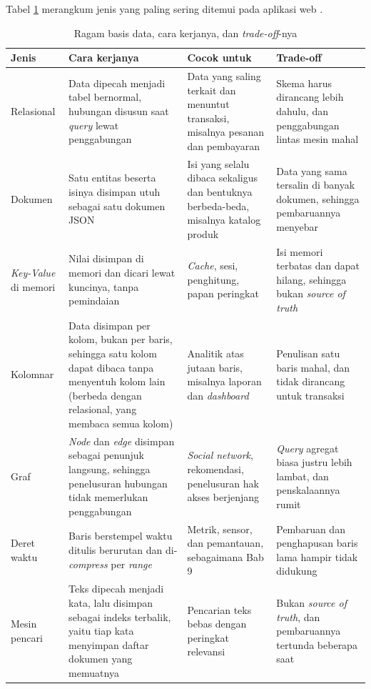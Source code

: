 Tabel \ref{tab:jenis-basis-data} merangkum jenis yang paling sering ditemui
pada aplikasi web \cite{kleppmann2017ddia}.

\begin{table}[!htb]
  \centering
  \caption{Ragam basis data, cara kerjanya, dan \textit{trade-off}-nya}
  \label{tab:jenis-basis-data}
  \begin{tabularx}{\textwidth}{lXXX}
    \hline
    \textbf{Jenis} & \textbf{Cara kerjanya} & \textbf{Cocok untuk} & \textbf{Trade-off} \\
    \hline
    Relasional & Data dipecah menjadi tabel bernormal, hubungan disusun saat \textit{query} lewat penggabungan & Data yang saling terkait dan menuntut transaksi, misalnya pesanan dan pembayaran & Skema harus dirancang lebih dahulu, dan penggabungan lintas mesin mahal \\
    \hline
    Dokumen & Satu entitas beserta isinya disimpan utuh sebagai satu dokumen JSON & Isi yang selalu dibaca sekaligus dan bentuknya berbeda-beda, misalnya katalog produk & Data yang sama tersalin di banyak dokumen, sehingga pembaruannya menyebar \\
    \hline
    \textit{Key-Value} di memori & Nilai disimpan di memori dan dicari lewat kuncinya, tanpa pemindaian & \textit{Cache}, sesi, penghitung, papan peringkat & Isi memori terbatas dan dapat hilang, sehingga bukan \textit{source of truth} \\
    \hline
    Kolomnar & Data disimpan per kolom, bukan per baris, sehingga satu kolom dapat dibaca tanpa menyentuh kolom lain (berbeda dengan relasional, yang membaca semua kolom) & Analitik atas jutaan baris, misalnya laporan dan \textit{dashboard} & Penulisan satu baris mahal, dan tidak dirancang untuk transaksi \\
    \hline
    Graf & \textit{Node} dan \textit{edge} disimpan sebagai penunjuk langsung, sehingga penelusuran hubungan tidak memerlukan penggabungan & \textit{Social network}, rekomendasi, penelusuran hak akses berjenjang & \textit{Query} agregat biasa justru lebih lambat, dan penskalaannya rumit \\
    \hline
    Deret waktu & Baris berstempel waktu ditulis berurutan dan di-\textit{compress} per \textit{range} & Metrik, sensor, dan pemantauan, sebagaimana Bab 9 & Pembaruan dan penghapusan baris lama hampir tidak didukung \\
    \hline
    Mesin pencari & Teks dipecah menjadi kata, lalu disimpan sebagai indeks terbalik, yaitu tiap kata menyimpan daftar dokumen yang memuatnya & Pencarian teks bebas dengan peringkat relevansi & Bukan \textit{source of truth}, dan pembaruannya tertunda beberapa saat \\
    \hline
  \end{tabularx}
\end{table}

